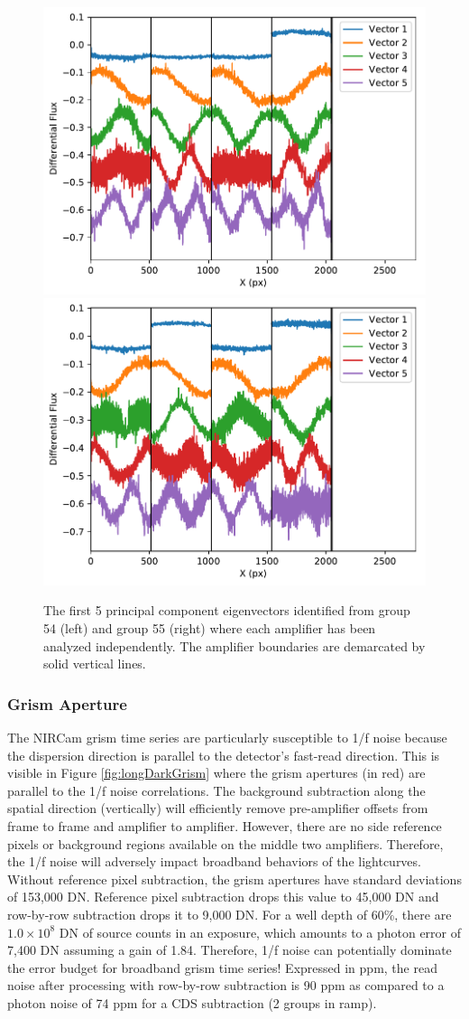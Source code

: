 \documentclass{aastex62}
\begin{document}
\begin{figure}[!hbtp]
\centering
\includegraphics[width=.4\columnwidth]{pca_dark_ind_amp_grp_54_extra_bias_sub.pdf}
\includegraphics[width=.4\columnwidth]{pca_dark_ind_amp_grp_55_extra_bias_sub.pdf}
\caption{The first 5 principal component eigenvectors identified from group 54 (left) and group 55 (right) where each amplifier has been analyzed independently.
The amplifier boundaries are demarcated by solid vertical lines.
}\label{fig:pcaEigenvectorsIndAmp}
\end{figure}

\clearpage

\subsubsection{Grism Aperture}
The NIRCam grism time series are particularly susceptible to 1/f noise because the dispersion direction is parallel to the detector's fast-read direction.
This is visible in Figure \ref{fig:longDarkGrism} where the grism apertures (in red) are parallel to the 1/f noise correlations.
The background subtraction along the spatial direction (vertically) will efficiently remove pre-amplifier offsets from frame to frame and amplifier to amplifier.
However, there are no side reference pixels or background regions available on the middle two amplifiers.
Therefore, the 1/f noise will adversely impact broadband behaviors of the lightcurves.
Without reference pixel subtraction, the grism apertures have standard deviations of 153,000 DN.
Reference pixel subtraction drops this value to 45,000 DN and row-by-row subtraction drops it to 9,000 DN.
For a well depth of 60\%, there are $1.0 \times 10^8$ DN of source counts in an exposure, which amounts to a photon error of 7,400 DN assuming a gain of 1.84.
Therefore, 1/f noise can potentially dominate the error budget for broadband grism time series!
Expressed in ppm, the read noise after processing with row-by-row subtraction is 90 ppm as compared to a photon noise of 74 ppm for a CDS subtraction (2 groups in ramp).
\end{document}
